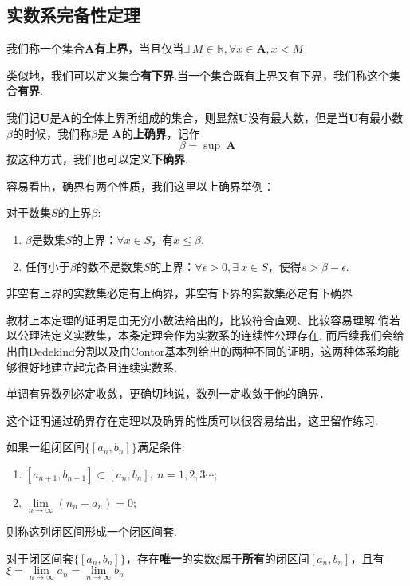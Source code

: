 	\subsection{实数系完备性定理}
	\begin{definition}[有界性]
		我们称一个集合$\bm{A}$\textbf{有上界}，当且仅当$\exists\ M\in\mathbb{R},\forall x\in\bm{A},x<M$\par
		类似地，我们可以定义集合\textbf{有下界}.当一个集合既有上界又有下界，我们称这个集合\textbf{有界}.\par
		我们记$\bm{U}$是$\bm{A}$的全体上界所组成的集合，则显然$\bm{U}$没有最大数，但是当$\bm{U}$有最小数$\beta$的时候，我们称$\beta$是
		$\bm{A}$的\textbf{上确界}，记作$$\beta = \sup\ \bm{A}$$按这种方式，我们也可以定义\textbf{下确界}.
	\end{definition}

	容易看出，确界有两个性质，我们这里以上确界举例：
	\begin{property}[上确界的性质]
		对于数集$S$的上界$\beta$:
		\begin{enumerate}
			\item $\beta$是数集$S$的上界：$\forall x\in S$，有$x\leq\beta$.
			\item 任何小于$\beta$的数不是数集$S$的上界：$\forall\epsilon>0,\exists\ x\in S$，使得$s>\beta-\epsilon$.
		\end{enumerate}
	\end{property}
	\begin{theorem}
		非空有上界的实数集必定有上确界，非空有下界的实数集必定有下确界
	\end{theorem}

	教材上本定理的证明是由无穷小数法给出的，比较符合直观、比较容易理解.倘若以公理法定义实数集，本条定理会作为实数系的连续性公理存在.
	而后续我们会给出由Dedekind分割以及由Contor基本列给出的两种不同的证明，这两种体系均能够很好地建立起完备且连续实数系.
	\begin{theorem}[单调有界数列收敛定理]
		单调有界数列必定收敛，更确切地说，数列一定收敛于他的确界．
	\end{theorem}

	这个证明通过确界存在定理以及确界的性质可以很容易给出，这里留作练习.
	\begin{theorem}[闭区间套定理]
		如果一组闭区间$\{[a_n,b_n]\}$满足条件:\par
		\begin{enumerate}
			\item $[a_{n+1},b_{n+1}]\subset[a_n,b_n],\ n=1,2,3\cdots$;
			\item $\lim\limits_{n\rightarrow\infty}(n_n-a_n)=0$;
		\end{enumerate}
		则称这列闭区间形成一个闭区间套.\par
		对于闭区间套$\{[a_n,b_n]\}$，存在\textbf{唯一}的实数$\xi$属于\textbf{所有}的闭区间$[a_n,b_n]$，且有$\xi=\lim\limits_{n\rightarrow\infty}a_n=\lim\limits_{n\rightarrow\infty}b_n$
	\end{theorem}

